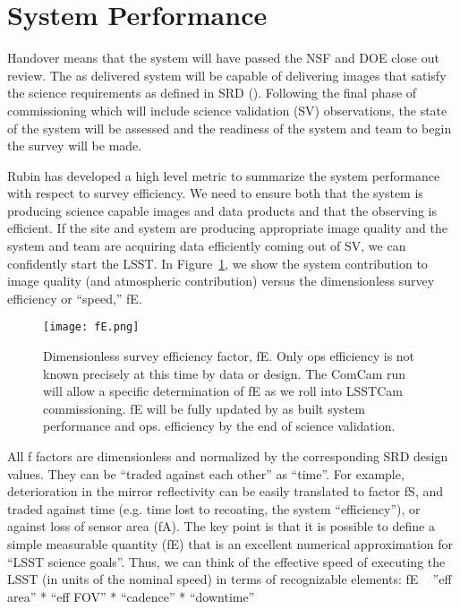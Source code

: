 \section{System Performance}
  
Handover means that the system will have passed the NSF and DOE close out review. The as delivered system will be capable of delivering images that satisfy the science requirements as defined in SRD (\cite{LPM-17}). Following the final phase of commissioning which will include science validation (SV) observations, the state of the system will be assessed and the readiness of the system and team to begin the survey will be made. 

Rubin has developed a high level metric to summarize the system performance with respect to survey efficiency. We need to ensure both that the system is producing science capable images and data products and that the observing is efficient. 
If the site and system are producing appropriate image quality and the system and team are acquiring data efficiently coming out of SV, we can confidently start the LSST. In Figure~\ref{fE}, we show the system contribution to image quality (and atmospheric contribution) versus the dimensionless survey efficiency or ``speed,'' fE. 

\begin{figure}%
  \centering
\texttt{[image: fE.png]}
\caption{Dimensionless survey efficiency factor, fE. Only ops efficiency is not known precisely at this time by data or design. The ComCam run will allow a specific determination of fE as we roll into LSSTCam commissioning. fE will be fully updated by as built system performance and ops. efficiency by the end of science validation.}
\label{fE}
\end{figure}

All f factors are dimensionless and normalized by the corresponding SRD design values. They can be “traded against each other” as “time”.
For example, deterioration in the mirror reflectivity can be easily translated to factor fS, and traded against time (e.g. time lost to recoating, the system “efficiency”), or against loss of sensor area (fA).
The key point is that it is possible to define a simple measurable quantity (fE) that is an excellent numerical approximation for “LSST science goals”. Thus, we can think of the effective speed of executing the LSST (in units of the nominal speed) in terms of recognizable elements: fE ~ ”eff area” * “eff FOV” * “cadence” * “downtime”


